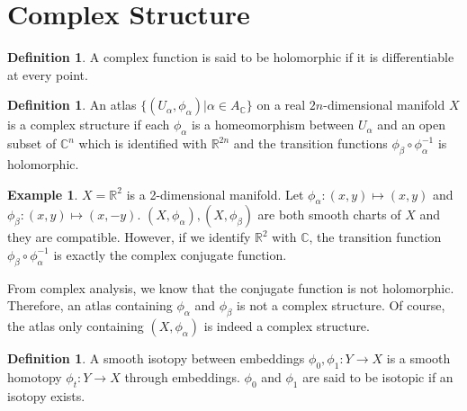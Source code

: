 \documentclass[11pt, psamsfonts]{amsart}
\theoremstyle{definition}
\newtheorem{defn}[thm]{Definition}
\newtheorem{exmp}[thm]{Example}
\theoremstyle{remark}
\numberwithin{equation}{section}
\begin{document}
\section{Complex Structure}

\begin{defn}
  A complex function is said to be holomorphic if it is differentiable at every point.
\end{defn}

\begin{defn}
  An atlas $\{ (U_{\alpha}, \phi_{\alpha}) \vert \alpha \in A_{\mathbb{C}} \}$ on a real $2n$-dimensional manifold $X$ is a complex structure if each $\phi_{\alpha}$ is a homeomorphism between $U_{\alpha}$ and an open subset of $\mathbb{C}^n$ which is identified with $\mathbb{R}^{2n}$ and the transition functions $\phi_{\beta} \circ \phi_{\alpha}^{-1}$ is holomorphic.
\end{defn}

\begin{exmp}
  $X = \mathbb{R}^2$ is a 2-dimensional manifold.
  Let $\phi_{\alpha}: (x, y) \mapsto (x, y)$ and $\phi_{\beta}: (x, y) \mapsto(x, -y)$.
  $(X, \phi_{\alpha}), (X, \phi_{\beta})$ are both smooth charts of $X$ and they are compatible.
  However, if we identify $\mathbb{R}^2$ with $\mathbb{C}$, the transition function $\phi_{\beta} \circ \phi_{\alpha}^{-1}$ is exactly the complex conjugate function.
  \begin{center}
  \end{center}
  From complex analysis, we know that the conjugate function is not holomorphic.
  Therefore, an atlas containing $\phi_{\alpha}$ and $\phi_{\beta}$ is not a complex structure.
  Of course, the atlas only containing $(X, \phi_{\alpha})$ is indeed a complex structure.
\end{exmp}

\begin{defn}
  A smooth isotopy between embeddings $\phi_0, \phi_1: Y \rightarrow X$ is a smooth homotopy $\phi_t:Y \rightarrow X$ through embeddings.
  $\phi_0$ and $\phi_1$ are said to be isotopic if an isotopy exists.
\end{defn}
\end{document}
